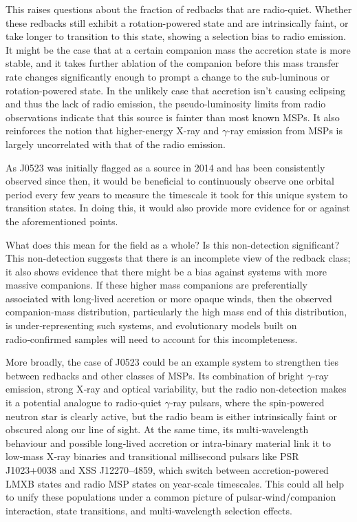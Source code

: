 This raises questions about the fraction of redbacks that are radio-quiet. Whether these redbacks still exhibit a rotation-powered state and are intrinsically faint, or take longer to transition to this state, showing a selection bias to radio emission. It might be the case that at a certain companion mass the accretion state is more stable, and it takes further ablation of the companion before this mass transfer rate changes significantly enough to prompt a change to the sub-luminous or rotation-powered state. In the unlikely case that accretion isn't causing eclipsing and thus the lack of radio emission, the pseudo-luminosity limits from radio observations indicate that this source is fainter than most known MSPs. It also reinforces the notion that higher-energy X-ray and $\gamma$-ray emission from MSPs is largely uncorrelated with that of the radio emission. 

As J0523 was initially flagged as a source in 2014 and has been consistently observed since then, it would be beneficial to continuously observe one orbital period every few years to measure the timescale it took for this unique system to transition states. In doing this, it would also provide more evidence for or against the aforementioned points. 

What does this mean for the field as a whole? Is this non-detection significant? This non-detection suggests that there is an incomplete view of the redback class; it also shows evidence that there might be a bias against systems with more massive companions. If these higher mass companions are preferentially associated with long‑lived accretion or more opaque winds, then the observed companion‑mass distribution, particularly the high mass end of this distribution, is under‑representing such systems, and evolutionary models built on radio‑confirmed samples will need to account for this incompleteness.

More broadly, the case of J0523 could be an example system to strengthen ties between redbacks and other classes of MSPs. Its combination of bright $\gamma$‑ray emission, strong X‑ray and optical variability, but the radio non‑detection makes it a potential analogue to radio‑quiet $\gamma$‑ray pulsars, where the spin‑powered neutron star is clearly active, but the radio beam is either intrinsically faint or obscured along our line of sight. At the same time, its multi‑wavelength behaviour and possible long‑lived accretion or intra‑binary material link it to low‑mass X‑ray binaries and transitional millisecond pulsars like PSR J1023+0038 and XSS J12270–4859, which switch between accretion‑powered LMXB states and radio MSP states on year‑scale timescales. This could all help to unify these populations under a common picture of pulsar‑wind/companion interaction, state transitions, and multi‑wavelength selection effects.

